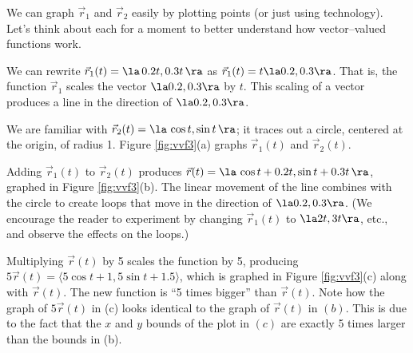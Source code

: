 {We can graph $\vec r_1$ and $\vec r_2$ easily by plotting points (or just using technology). Let's think about each for a moment to better understand how vector--valued functions work.

We can rewrite $\vec r_1(t) = \la\, 0.2t,0.3t\,\ra$ as $ \vec r_1(t) = t\la 0.2,0.3\ra$. That is, the function $\vec r_1$ scales the vector $\la 0.2,0.3\ra$ by $t$. This scaling of a vector produces a line in the direction of $\la 0.2,0.3\ra$. 

We are familiar with $\vec r_2(t) = \la\, \cos t,\sin t\,\ra$; it traces out a circle, centered at the origin, of radius 1. Figure \ref{fig:vvf3}(a) graphs $\vec r_1(t)$ and $\vec r_2(t)$.

Adding $\vec r_1(t)$ to $\vec r_2(t)$ produces $\vec r(t) = \la\,\cos t + 0.2t,\sin t+0.3t\,\ra$, graphed in Figure \ref{fig:vvf3}(b). The linear movement of the line combines with the circle to create loops that move in the direction of $\la 0.2,0.3\ra$.  (We encourage the reader to experiment by changing $\vec r_1(t)$ to $\la 2t,3t\ra$, etc., and observe the effects on the loops.)

Multiplying $\vec r(t)$ by 5 scales the function by 5, producing $5\vec r(t) =  \langle 5\cos t+1,5\sin t+1.5\rangle$, which is graphed in Figure \ref{fig:vvf3}(c) along with $\vec r(t)$. The new function is ``5 times bigger'' than $\vec r(t)$. Note how the graph of $5\vec r(t)$ in (c) looks identical to the graph of $\vec r(t)$ in $(b)$. This is due to the fact that the $x$ and $y$ bounds of the plot in $(c)$ are exactly 5 times larger than the bounds in (b).
}\\

